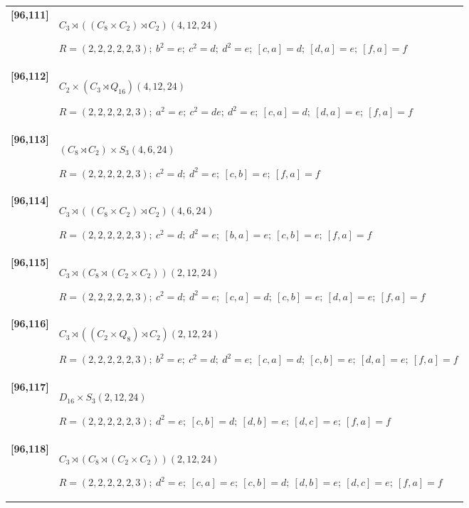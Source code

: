 \documentclass[UTF8,fontset=fandol,11pt,a4paper]{ctexart}
\begin{document}
\begin{longtable}{@{}p{17mm}>{\raggedright\arraybackslash}p{141mm}@{}}
\textbf{[96,111]} & $C_{3}\rtimes ((C_{8}\times C_{2})\rtimes C_{2})$\quad $(4,12,24)$\par\(R=(2,2,2,2,2,3);\allowbreak\ b^{2}=e;\allowbreak\ c^{2}=d;\allowbreak\ d^{2}=e;\allowbreak\ [c,a]=d;\allowbreak\ [d,a]=e;\allowbreak\ [f,a]=f\)\\[3pt]

\textbf{[96,112]} & $C_{2}\times (C_{3}\rtimes Q_{16})$\quad $(4,12,24)$\par\(R=(2,2,2,2,2,3);\allowbreak\ a^{2}=e;\allowbreak\ c^{2}=de;\allowbreak\ d^{2}=e;\allowbreak\ [c,a]=d;\allowbreak\ [d,a]=e;\allowbreak\ [f,a]=f\)\\[3pt]

\textbf{[96,113]} & $(C_{8}\rtimes C_{2})\times S_{3}$\quad $(4,6,24)$\par\(R=(2,2,2,2,2,3);\allowbreak\ c^{2}=d;\allowbreak\ d^{2}=e;\allowbreak\ [c,b]=e;\allowbreak\ [f,a]=f\)\\[3pt]

\textbf{[96,114]} & $C_{3}\rtimes ((C_{8}\times C_{2})\rtimes C_{2})$\quad $(4,6,24)$\par\(R=(2,2,2,2,2,3);\allowbreak\ c^{2}=d;\allowbreak\ d^{2}=e;\allowbreak\ [b,a]=e;\allowbreak\ [c,b]=e;\allowbreak\ [f,a]=f\)\\[3pt]

\textbf{[96,115]} & $C_{3}\rtimes (C_{8}\rtimes (C_{2}\times C_{2}))$\quad $(2,12,24)$\par\(R=(2,2,2,2,2,3);\allowbreak\ c^{2}=d;\allowbreak\ d^{2}=e;\allowbreak\ [c,a]=d;\allowbreak\ [c,b]=e;\allowbreak\ [d,a]=e;\allowbreak\ [f,a]=f\)\\[3pt]

\textbf{[96,116]} & $C_{3}\rtimes ((C_{2}\times Q_{8})\rtimes C_{2})$\quad $(2,12,24)$\par\(R=(2,2,2,2,2,3);\allowbreak\ b^{2}=e;\allowbreak\ c^{2}=d;\allowbreak\ d^{2}=e;\allowbreak\ [c,a]=d;\allowbreak\ [c,b]=e;\allowbreak\ [d,a]=e;\allowbreak\ [f,a]=f\)\\[3pt]

\textbf{[96,117]} & $D_{16}\times S_{3}$\quad $(2,12,24)$\par\(R=(2,2,2,2,2,3);\allowbreak\ d^{2}=e;\allowbreak\ [c,b]=d;\allowbreak\ [d,b]=e;\allowbreak\ [d,c]=e;\allowbreak\ [f,a]=f\)\\[3pt]

\textbf{[96,118]} & $C_{3}\rtimes (C_{8}\rtimes (C_{2}\times C_{2}))$\quad $(2,12,24)$\par\(R=(2,2,2,2,2,3);\allowbreak\ d^{2}=e;\allowbreak\ [c,a]=e;\allowbreak\ [c,b]=d;\allowbreak\ [d,b]=e;\allowbreak\ [d,c]=e;\allowbreak\ [f,a]=f\)\\[3pt]


\end{longtable}
\end{document}
